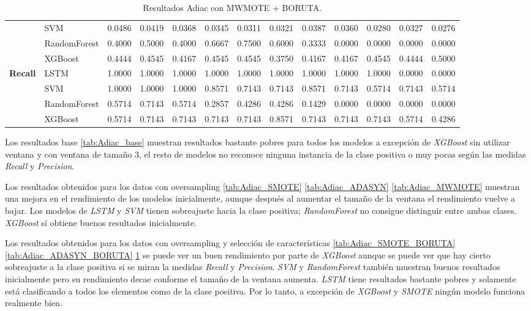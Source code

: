 \begin{table}[h]
\begin{adjustbox}{max width=15cm}
\begin{tabular}{|c|l|r|r|r|r|r|r|r|r|r|r|r|}
			& SVM &  0.0486 &  0.0419 &  0.0368 &  0.0345 &  0.0311 &  0.0321 &  0.0387 &  0.0360 &  0.0280 &  0.0327 &  0.0276 \\
			& RandomForest &  0.4000 &  0.5000 &  0.4000 &  0.6667 &  0.7500 &  0.6000 &  0.3333 &  0.0000 &  0.0000 &  0.0000 &  0.0000 \\
			& XGBoost &  0.4444 &  0.4545 &  0.4167 &  0.4545 &  0.4545 &  0.3750 &  0.4167 &  0.4167 &  0.4545 &  0.4444 &  0.5000 \\
			\hline
			\textbf{Recall} & LSTM &  1.0000 &  1.0000 &  1.0000 &  1.0000 &  1.0000 &  1.0000 &  1.0000 &  1.0000 &  1.0000 &  0.0000 &  0.0000 \\
			& SVM &  1.0000 &  1.0000 &  1.0000 &  0.8571 &  0.7143 &  0.7143 &  0.8571 &  0.7143 &  0.5714 &  0.7143 &  0.5714 \\
			& RandomForest &  0.5714 &  0.7143 &  0.5714 &  0.2857 &  0.4286 &  0.4286 &  0.1429 &  0.0000 &  0.0000 &  0.0000 &  0.0000 \\
			& XGBoost &  0.5714 &  0.7143 &  0.7143 &  0.7143 &  0.7143 &  0.8571 &  0.7143 &  0.7143 &  0.7143 &  0.5714 &  0.4286 \\
			\hline
		\end{tabular}
	\end{adjustbox}
	\caption{Resultados Adiac con MWMOTE + BORUTA.}
	\label{tab:Adiac_MWMOTE_BORUTA}
\end{table}
\newpage
Los resultados base \ref{tab:Adiac_base} muestran resultados bastante pobres para todos los modelos a excepción de \textit{XGBoost} sin utilizar ventana y con ventana de tamaño 3, el resto de modelos no reconoce ninguna instancia de la clase positiva o muy pocas según las medidas \textit{Recall} y \textit{Precision}.\newline

Los resultados obtenidos para los datos con oversampling \ref{tab:Adiac_SMOTE}  \ref{tab:Adiac_ADASYN} \ref{tab:Adiac_MWMOTE} muestran una mejora en el rendimiento de los modelos inicialmente, aunque después al aumentar el tamaño de la ventana el rendimiento vuelve a bajar. Los modelos de \textit{LSTM} y \textit{SVM} tienen sobreajuste hacia la clase positiva; \textit{RandomForest} no consigue distinguir entre ambas clases. \textit{XGBoost} sí obtiene buenos resultados inicialmente.\newline

Los resultados obtenidos para los datos con oversampling y selección de características \ref{tab:Adiac_SMOTE_BORUTA} \ref{tab:Adiac_ADASYN_BORUTA} \ref{tab:Adiac_MWMOTE_BORUTA} se puede ver un buen rendimiento por parte de \textit{XGBoost} aunque se puede ver que hay cierto sobreajuste a la clase positiva si se miran la medidas \textit{Recall} y \textit{Precision}. \textit{SVM} y \textit{RandomForest} también muestran buenos resultados inicialmente pero su rendimiento decae conforme el tamaño de la ventana aumenta. \textit{LSTM} tiene resultados bastante pobres y solamente está clasificando a todos los elementos como de la clase positiva. Por lo tanto, a excepción de \textit{XGBoost} y \textit{SMOTE} ningún modelo funciona realmente bien.

